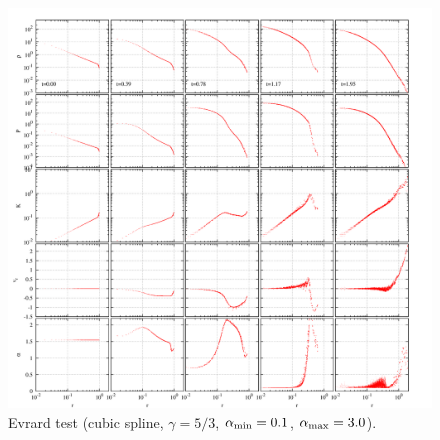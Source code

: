 \documentclass[fleqn,dvipdfmx]{article}
\begin{document}
\begin{figure}
  \begin{center}
    \includegraphics[width=16cm,bb=0 0 2120 2000]{fig/evrard/draw.png}
  \end{center}
  \caption{Evrard test (cubic spline, $\gamma=5/3$, $\alpha_{\rm
      min}=0.1$, $\alpha_{\rm max}=3.0$).}
\end{figure}
\end{document}
